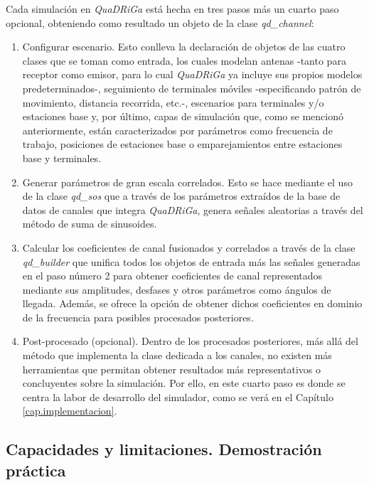 
Cada simulación en \textit{QuaDRiGa} está hecha en tres pasos más un cuarto paso opcional, obteniendo como resultado un objeto de la clase \textit{qd\_channel}:

\begin{enumerate}
    \item Configurar escenario. Esto conlleva la declaración de objetos de las cuatro clases que se toman como entrada, los cuales modelan antenas -tanto para receptor como emisor, para lo cual \textit{QuaDRiGa} ya incluye sus propios modelos predeterminados-, seguimiento de terminales móviles -especificando patrón de movimiento, distancia recorrida, etc.-, escenarios para terminales y/o estaciones base y, por último, capas de simulación que, como se mencionó anteriormente, están caracterizados por parámetros como frecuencia de trabajo, posiciones de estaciones base o emparejamientos entre estaciones base y terminales.
    \item Generar parámetros de gran escala correlados. Esto se hace mediante el uso de la clase \textit{qd\_sos} que a través de los parámetros extraídos de la base de datos de canales que integra \textit{QuaDRiGa}, genera señales aleatorias a través del método de suma de sinusoides.
    \item Calcular los coeficientes de canal fusionados y correlados a través de la clase \textit{qd\_builder} que unifica todos los objetos de entrada más las señales generadas en el paso número 2 para obtener coeficientes de canal representados mediante sus amplitudes, desfases y otros parámetros como ángulos de llegada. Además, se ofrece la opción de obtener dichos coeficientes en dominio de la frecuencia para posibles procesados posteriores.
    \item Post-procesado (opcional). Dentro de los procesados posteriores, más allá del método que implementa la clase dedicada a los canales, no existen más herramientas que permitan obtener resultados más representativos o concluyentes sobre la simulación. Por ello, en este cuarto paso es donde se centra la labor de desarrollo del simulador, como se verá en el Capítulo \ref{cap.implementacion}.
\end{enumerate}

\subsection{Capacidades y limitaciones. Demostración práctica}

